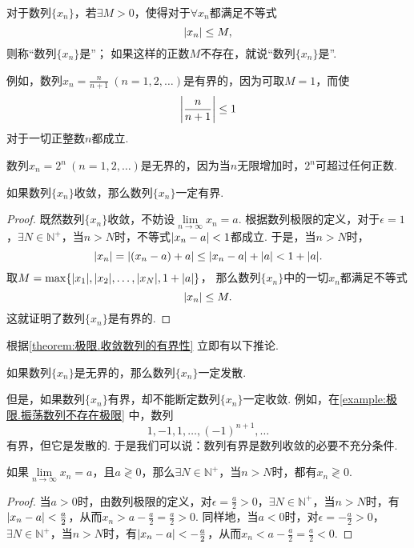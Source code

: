\begin{definition}[数列的有界性]
对于数列\(\{x_n\}\)，若\(\exists M > 0\)，使得对于\(\forall x_n\)都满足不等式\[
\abs{x_n} \leq M,
\]则称“数列\(\{x_n\}\)是”；
如果这样的正数\(M\)不存在，就说“数列\(\{x_n\}\)是”.
\end{definition}
例如，数列\(x_n = \frac{n}{n+1}\ (n=1,2,\dotsc)\)是有界的，因为可取\(M=1\)，而使\[
\abs{\frac{n}{n+1}} \leq 1
\]对于一切正整数\(n\)都成立.

数列\(x_n = 2^n\ (n=1,2,\dotsc)\)是无界的，因为当\(n\)无限增加时，\(2^n\)可超过任何正数.

\begin{theorem}[收敛数列的有界性]\label{theorem:极限.收敛数列的有界性}
如果数列\(\{x_n\}\)收敛，那么数列\(\{x_n\}\)一定有界.
\begin{proof}
既然数列\(\{x_n\}\)收敛，不妨设\(\lim\limits_{n\to\infty}x_n = a\).
根据数列极限的定义，对于\(\epsilon = 1\)，\(\exists N \in \mathbb{N}^+\)，当\(n > N\)时，不等式\(\abs{x_n - a} < 1\)都成立.
于是，当\(n > N\)时，\[
\abs{x_n} = \abs{(x_n - a) + a} \leq \abs{x_n - a} + \abs{a} < 1 + \abs{a}.
\]
取\(M = \max\{\abs{x_1},\abs{x_2},\dotsc,\abs{x_N},1+\abs{a}\}\)，
那么数列\(\{x_n\}\)中的一切\(x_n\)都满足不等式\[
\abs{x_n} \leq M.
\]
这就证明了数列\(\{x_n\}\)是有界的.
\end{proof}
\end{theorem}

根据\cref{theorem:极限.收敛数列的有界性} 立即有以下推论.
\begin{corollary}
如果数列\(\{x_n\}\)是无界的，那么数列\(\{x_n\}\)一定发散.
\end{corollary}
但是，如果数列\(\{x_n\}\)有界，却不能断定数列\(\{x_n\}\)一定收敛.
例如，在\cref{example:极限.振荡数列不存在极限} 中，数列\[
1,-1,1,\dotsc,(-1)^{n+1},\dotsc
\]有界，但它是发散的.
于是我们可以说：数列有界是数列收敛的必要不充分条件.

\begin{theorem}[收敛数列的保号性]\label{theorem:极限.收敛数列的保号性}
如果\(\lim\limits_{n\to\infty}x_n = a\)，且\(a \gtrless 0\)，那么\(\exists N \in \mathbb{N}^+\)，当\(n > N\)时，都有\(x_n \gtrless 0\).
\begin{proof}
当\(a > 0\)时，由数列极限的定义，对\(\epsilon = \frac{a}{2} > 0\)，\(\exists N \in \mathbb{N}^+\)，当\(n > N\)时，有\(\abs{x_n - a} < \frac{a}{2}\)，从而\(x_n > a - \frac{a}{2} = \frac{a}{2} > 0\).
同样地，当\(a < 0\)时，对\(\epsilon = -\frac{a}{2} > 0\)，\(\exists N \in \mathbb{N}^+\)，当\(n > N\)时，有\(\abs{x_n - a} < -\frac{a}{2}\)，从而\(x_n < a - \frac{a}{2} = \frac{a}{2} < 0\).
\end{proof}
\end{theorem}

